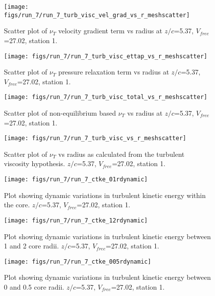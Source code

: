 \begin{figure}[H]
\centering
\texttt{[image: figs/run\_7/run\_7\_turb\_visc\_vel\_grad\_vs\_r\_meshscatter]}
\caption{Scatter plot of $\nu_T$ velocity gradient term vs radius at $z/c$=5.37, $V_{free}$=27.02, station 1.}
\end{figure}


\begin{figure}[H]
\centering
\texttt{[image: figs/run\_7/run\_7\_turb\_visc\_ettap\_vs\_r\_meshscatter]}
\caption{Scatter plot of $\nu_T$ pressure relaxation term vs radius at $z/c$=5.37, $V_{free}$=27.02, station 1.}
\end{figure}


\begin{figure}[H]
\centering
\texttt{[image: figs/run\_7/run\_7\_turb\_visc\_total\_vs\_r\_meshscatter]}
\caption{Scatter plot of non-equilibrium based $\nu_T$ vs radius at $z/c$=5.37, $V_{free}$=27.02, station 1.}
\end{figure}


\begin{figure}[H]
\centering
\texttt{[image: figs/run\_7/run\_7\_turb\_visc\_vs\_r\_meshscatter]}
\caption{Scatter plot of $\nu_T$ vs radius as calculated from the turbulent viscosity hypothesis. $z/c$=5.37, $V_{free}$=27.02, station 1.}
\end{figure}


\begin{figure}[H]
\centering
\texttt{[image: figs/run\_7/run\_7\_ctke\_01rdynamic]}
\caption{Plot showing dynamic variations in turbulent kinetic energy within the core. $z/c$=5.37, $V_{free}$=27.02, station 1.}
\end{figure}


\begin{figure}[H]
\centering
\texttt{[image: figs/run\_7/run\_7\_ctke\_12rdynamic]}
\caption{Plot showing dynamic variations in turbulent kinetic energy between 1 and 2 core radii. $z/c$=5.37, $V_{free}$=27.02, station 1.}
\end{figure}


\begin{figure}[H]
\centering
\texttt{[image: figs/run\_7/run\_7\_ctke\_005rdynamic]}
\caption{Plot showing dynamic variations in turbulent kinetic energy between 0 and 0.5 core radii. $z/c$=5.37, $V_{free}$=27.02, station 1.}
\end{figure}


